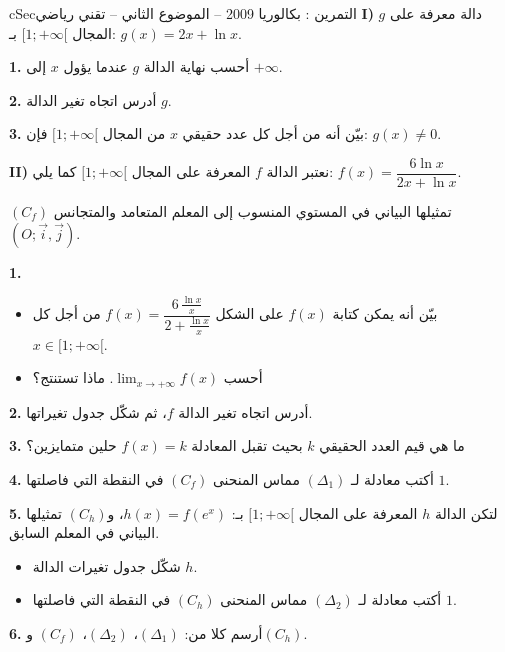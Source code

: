 \documentclass[12pt,a4paper]{article}
\newenvironment{BOX}[2]{\begin{otherlanguage}{english}\begin{arbox}{#1}{#2}}{\end{arbox}\end{otherlanguage}}
\newcounter{exo}
\newenvironment{tamrin}[1]{\stepcounter{exo}\begin{BOX}{cSec}{التمرين \theexo: #1}}{\end{BOX}}
\newenvironment{sq}{\begin{itemize}[leftmargin=2.4em,itemsep=3pt]}{\end{itemize}}
\newcommand{\qa}{\item[(أ)]}\newcommand{\qb}{\item[(ب)]}\newcommand{\qc}{\item[(جـ)]}\newcommand{\qd}{\item[(د)]}\newcommand{\qe}{\item[(هـ)]}
\newcommand{\QQ}[1]{\par\smallskip\textbf{#1.} }
\begin{document}
\begin{tamrin}{بكالوريا 2009 -- الموضوع الثاني -- تقني رياضي}
\textbf{I)} $g$ دالة معرفة على المجال $[1;+\infty[$ بـ: $g(x)=2x+\ln x$.
\QQ{1} أحسب نهاية الدالة $g$ عندما يؤول $x$ إلى $+\infty$.
\QQ{2} أدرس اتجاه تغير الدالة $g$.
\QQ{3} بيّن أنه من أجل كل عدد حقيقي $x$ من المجال $[1;+\infty[$ فإن: $g(x)\neq 0$.

\textbf{II)} نعتبر الدالة $f$ المعرفة على المجال $[1;+\infty[$ كما يلي: $f(x)=\dfrac{6\ln x}{2x+\ln x}$.

$(C_f)$ تمثيلها البياني في المستوي المنسوب إلى المعلم المتعامد والمتجانس $(O;\vec{i},\vec{j})$.
\QQ{1}
\begin{sq}
\qa بيّن أنه يمكن كتابة $f(x)$ على الشكل $f(x)=\dfrac{6\,\frac{\ln x}{x}}{2+\frac{\ln x}{x}}$ من أجل كل $x\in[1;+\infty[$.
\qb أحسب $\displaystyle\lim_{x\to+\infty}f(x)$. ماذا تستنتج؟
\end{sq}
\QQ{2} أدرس اتجاه تغير الدالة $f$، ثم شكّل جدول تغيراتها.
\QQ{3} ما هي قيم العدد الحقيقي $k$ بحيث تقبل المعادلة $f(x)=k$ حلين متمايزين؟
\QQ{4} أكتب معادلة لـ $(\Delta_1)$ مماس المنحنى $(C_f)$ في النقطة التي فاصلتها $1$.
\QQ{5} لتكن الدالة $h$ المعرفة على المجال $[1;+\infty[$ بـ: $h(x)=f\left(e^x\right)$، و$(C_h)$ تمثيلها البياني في المعلم السابق.
\begin{sq}
\qa شكّل جدول تغيرات الدالة $h$.
\qb أكتب معادلة لـ $(\Delta_2)$ مماس المنحنى $(C_h)$ في النقطة التي فاصلتها $1$.
\end{sq}
\QQ{6} أرسم كلا من: $(\Delta_1)$، $(\Delta_2)$، $(C_f)$ و$(C_h)$.
\end{tamrin}
\end{document}
